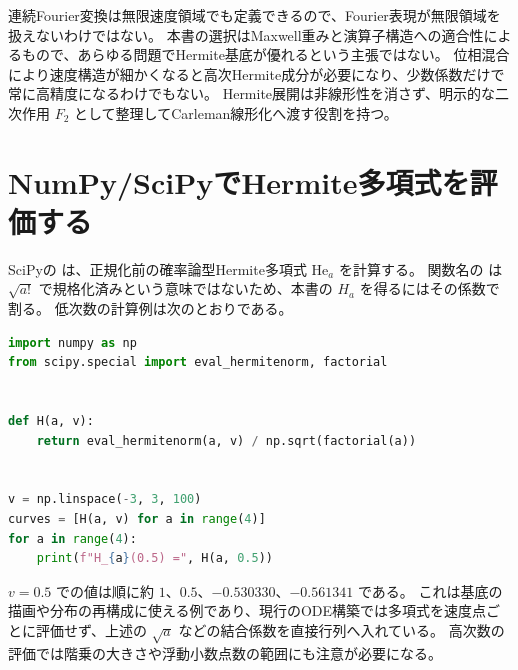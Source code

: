 連続Fourier変換は無限速度領域でも定義できるので、Fourier表現が無限領域を扱えないわけではない。
本書の選択はMaxwell重みと演算子構造への適合性によるもので、あらゆる問題でHermite基底が優れるという主張ではない。
位相混合により速度構造が細かくなると高次Hermite成分が必要になり、少数係数だけで常に高精度になるわけでもない。
Hermite展開は非線形性を消さず、明示的な二次作用 $F_2$ として整理してCarleman線形化へ渡す役割を持つ。

\section{NumPy/SciPyでHermite多項式を評価する}
SciPyの  は、正規化前の確率論型Hermite多項式 $\mathrm{He}_a$ を計算する。
関数名の  は $\sqrt{a!}$ で規格化済みという意味ではないため、本書の $H_a$ を得るにはその係数で割る。
低次数の計算例は次のとおりである。
\begin{lstlisting}[language=Python]
import numpy as np
from scipy.special import eval_hermitenorm, factorial


def H(a, v):
    return eval_hermitenorm(a, v) / np.sqrt(factorial(a))


v = np.linspace(-3, 3, 100)
curves = [H(a, v) for a in range(4)]
for a in range(4):
    print(f"H_{a}(0.5) =", H(a, 0.5))
\end{lstlisting}
$v=0.5$ での値は順に約 $1$、$0.5$、$-0.530330$、$-0.561341$ である。
これは基底の描画や分布の再構成に使える例であり、現行のODE構築では多項式を速度点ごとに評価せず、上述の $\sqrt a$ などの結合係数を直接行列へ入れている。
高次数の評価では階乗の大きさや浮動小数点数の範囲にも注意が必要になる。
